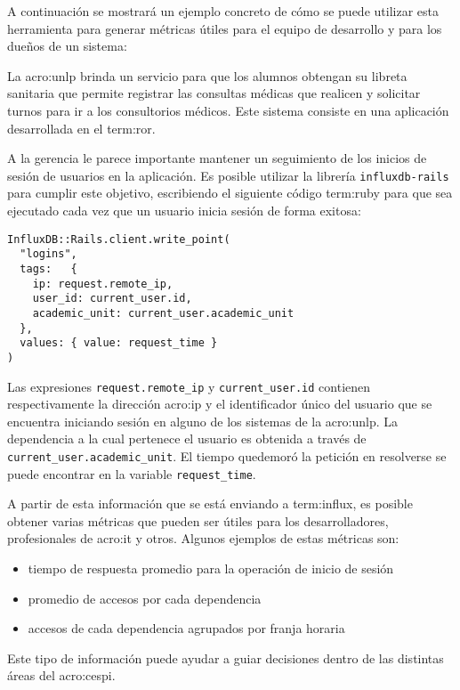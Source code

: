 A continuación se mostrará un ejemplo concreto de cómo se puede utilizar esta
herramienta para generar métricas útiles para el equipo de desarrollo y para
los dueños de un sistema:

La \gls{acro:unlp} brinda un servicio para que los alumnos obtengan su libreta
sanitaria que permite registrar las consultas médicas que realicen y solicitar
turnos para ir a los consultorios médicos. Este sistema consiste en una
aplicación desarrollada en el  \gls{term:ror}.

A la gerencia le parece importante mantener un seguimiento de los inicios de
sesión de usuarios en la aplicación. Es posible utilizar la librería
\texttt{influxdb-rails} para cumplir este objetivo, escribiendo el siguiente
código \gls{term:ruby} para que sea ejecutado cada vez que un usuario inicia
sesión de forma exitosa:

\begin{lstlisting}
InfluxDB::Rails.client.write_point(
  "logins",
  tags:   {
    ip: request.remote_ip,
    user_id: current_user.id,
    academic_unit: current_user.academic_unit
  },
  values: { value: request_time }
)
\end{lstlisting}

Las expresiones \lstinline{request.remote_ip} y \lstinline{current_user.id}
contienen respectivamente la dirección \gls{acro:ip} y el identificador único
del usuario que se encuentra iniciando sesión en alguno de los sistemas de la
\gls{acro:unlp}. La dependencia a la cual pertenece el usuario es obtenida a
través de \lstinline{current_user.academic_unit}. El tiempo quedemoró la
petición  en resolverse se puede encontrar en la variable
\lstinline{request_time}.

A partir de esta información que se está enviando a \gls{term:influx}, es
posible obtener varias métricas que pueden ser útiles para los desarrolladores,
profesionales de \gls{acro:it} y otros. Algunos ejemplos de estas métricas son:

\begin{itemize}
  \item tiempo de respuesta promedio para la operación de inicio de sesión
  \item promedio de accesos por cada dependencia
  \item accesos de cada dependencia agrupados por franja horaria
\end{itemize}

Este tipo de información puede ayudar a guiar decisiones dentro de las
distintas áreas del \gls{acro:cespi}.

